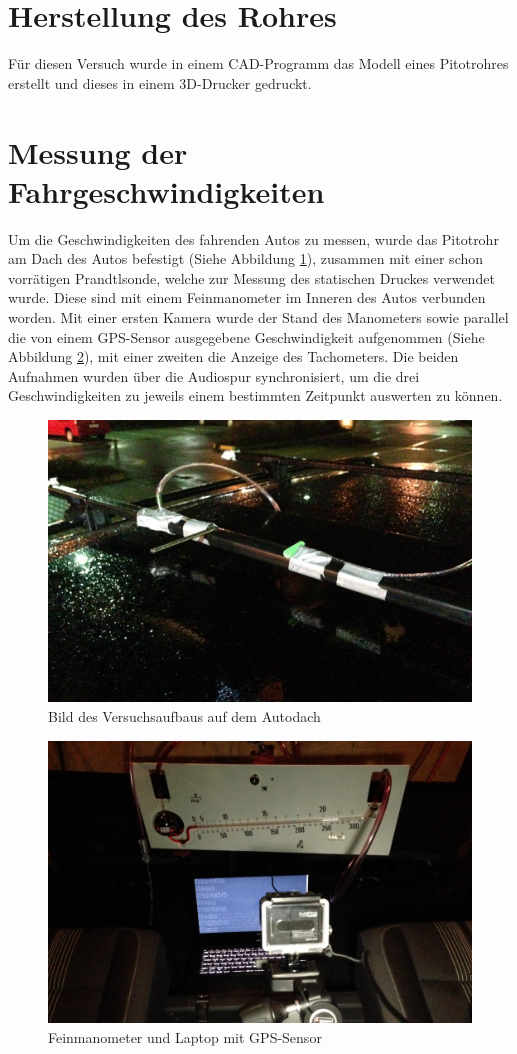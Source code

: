 \section{Herstellung des Rohres}
Für diesen Versuch wurde in einem CAD-Programm das Modell eines Pitotrohres erstellt und dieses in einem 3D-Drucker gedruckt.

\section{Messung der Fahrgeschwindigkeiten}
Um die Geschwindigkeiten des fahrenden Autos zu messen, wurde das Pitotrohr am Dach des Autos befestigt (Siehe Abbildung \ref{rohre}), zusammen mit einer schon vorrätigen Prandtlsonde, welche zur Messung des statischen Druckes verwendet wurde. Diese sind mit einem Feinmanometer im Inneren des Autos verbunden worden. Mit einer ersten Kamera wurde der Stand des Manometers sowie parallel die von einem GPS-Sensor ausgegebene Geschwindigkeit aufgenommen (Siehe Abbildung \ref{messung}), mit einer zweiten die Anzeige des Tachometers. Die beiden Aufnahmen wurden über die Audiospur synchronisiert, um die drei Geschwindigkeiten zu jeweils einem bestimmten Zeitpunkt auswerten zu können.

\begin{figure}
\centering
	\includegraphics[width=.8\textwidth]{images/rohre.jpg}
	\caption{Bild des Versuchsaufbaus auf dem Autodach}
	\label{rohre}
\end{figure}

\begin{figure}
\centering
	\includegraphics[width=.8\textwidth]{images/messung.jpg}
	\caption{Feinmanometer und Laptop mit GPS-Sensor}
	\label{messung}
\end{figure}

